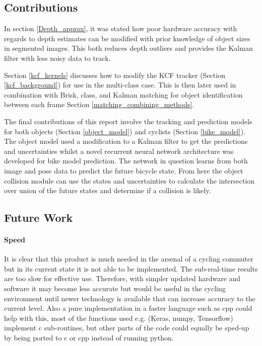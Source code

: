 \documentclass[11pt,twoside]{report}
\begin{document}
\subsection{Contributions}

In section \ref{Depth_approx}, it was stated how poor hardware accuracy with regards to depth estimates can be modified with prior knowledge of object sizes in segmented images. This both reduces depth outliers and provides the Kalman filter with less noisy data to track.

Section \ref{kcf_kernels} discusses how to modify the KCF tracker (Section \ref{kcf_background}) for use in the multi-class case. This is then later used in combination with Brisk, class, and Kalman matching for object identification between each frame Section \ref{matching_combining_methods}.

The final contributions of this report involve the tracking and prediction models for both objects (Section \ref{object_model}) and cyclists (Section \ref{bike_model}). The object model used a modification to a Kalman filter to get the predictions and uncertainties whilst a novel recurrent neural network architecture was developed for bike model prediction. The network in question learns from both image and pose data to predict the future bicycle state. From here the object collision module can use the states and uncertainties to calculate the intersection over union of the future states and determine if a collision is likely.

\subsection{Future Work}

\paragraph{Speed} It is clear that this product is much needed in the arsenal of a cycling commuter but in its current state it is not able to be implemented. The sub-real-time results are too slow for effective use. Therefore, with simpler updated hardware and software it may become less accurate but would be useful in the cycling environment until newer technology is available that can increase accuracy to the current level. Also a pure implementation in a faster language such as cpp could help with this, most of the functions used e.g. (Keras, numpy, Tensorflow) implement c sub-routines, but other parts of the code could equally be sped-up by being ported to c or cpp instead of running python.
\end{document}
